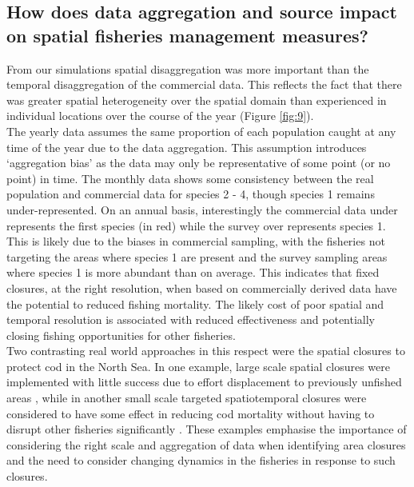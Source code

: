 \documentclass[review]{elsarticle}
\begin{document}
\subsection{How does data aggregation and source impact on spatial fisheries
	management measures?}

From our simulations spatial disaggregation was more important than the
temporal disaggregation of the commercial data. This reflects the fact that
there was greater spatial heterogeneity over the spatial domain than
experienced in individual locations over the course of the year (Figure
\ref{fig:9}). \\ 

The yearly data assumes the same proportion of each population caught at any
time of the year due to the data aggregation. This assumption introduces
`aggregation bias' as the data may only be representative of some point (or no
point) in time. The monthly data shows some consistency between the real
population and commercial data for species 2 - 4, though species 1 remains
under-represented.  On an annual basis, interestingly the commercial data under
represents the first species (in red) while the survey over represents species
1. This is likely due to the biases in commercial sampling, with the fisheries
not targeting the areas where species 1 are present and the survey sampling
areas where species 1 is more abundant than on average. This indicates that
fixed closures, at the right resolution, when based on commercially derived
data have the potential to reduced fishing mortality. The likely cost of poor
spatial and temporal resolution is associated with reduced effectiveness and
potentially closing fishing opportunities for other fisheries. \\

Two contrasting real world approaches in this respect were the spatial closures
to protect cod in the North Sea. In one example, large scale spatial closures
were implemented with little success due to effort displacement to previously
unfished areas \citep{Dinmore2003}, while in another small scale targeted
spatiotemporal closures were considered to have some effect in reducing cod
mortality without having to disrupt other fisheries significantly
\citep{Needle2011}. These examples emphasise the importance of considering the
right scale and aggregation of data when identifying area closures and the need
to consider changing dynamics in the fisheries in response to such closures. \\
\end{document}

